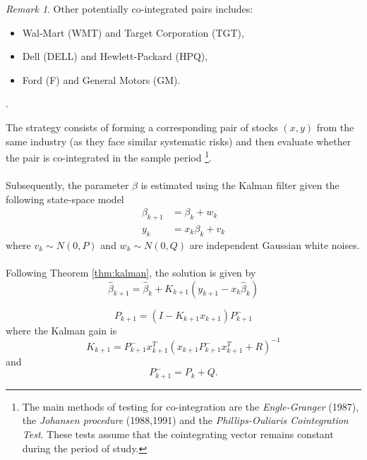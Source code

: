\documentclass{article}
\theoremstyle{definition}
\theoremstyle{remark}
\newtheorem{remark}[thm]{Remark}
\begin{document}
\begin{remark}
Other potentially co-integrated pairs includes:\\
\begin{itemize}\itemsep0pt \addtolength{\itemsep}{-1\baselineskip}
\item Wal-Mart (WMT) and Target Corporation (TGT),\\
\item Dell (DELL) and Hewlett-Packard (HPQ),\\
\item Ford (F) and General Motors (GM).
\end{itemize}
\end{remark}
{\tiny .}

The strategy consists of forming a corresponding pair of stocks $(x, y)$ from the same industry (as they face similar systematic risks) and then evaluate whether the pair is co-integrated in the sample period \footnote{The main methods of testing for co-integration are the \emph{Engle-Granger} (1987), the \emph{Johansen procedure} (1988,1991) and the \emph{Phillips-Ouliaris Cointegration Test}. These tests assume that the cointegrating vector remains constant during the period of study.}. \\
\\
Subsequently, the parameter $\beta$ is estimated using the Kalman filter given the following state-space model
\begin{align*}
\beta_{k+1}&=\beta_k+w_k\\
y_{k}&=x_k\beta_k+v_k
\end{align*}
where $v_k \sim N(0, P)$ and $w_k \sim N(0, Q)$ are independent Gaussian white noises.\\
\\
Following Theorem \ref{thm:kalman}, the solution is given by
\begin{equation*}
\hat{\beta}_{k+1}=\hat{\beta}_{k}+K_{k+1}(y_{k+1}-x_k\hat{\beta}_k)
\end{equation*}

\begin{equation*}
P_{k+1}=(I-K_{k+1}x_{k+1})P^-_{k+1}
\end{equation*}
where the Kalman gain is 
\begin{equation*}
K_{k+1}=P^-_{k+1}x_{k+1}^T(x_{k+1}P^-_{k+1}x_{k+1}^T+R)^{-1}
\end{equation*}
and
\begin{equation*}
P^-_{k+1}=P_k+Q.
\end{equation*}
\end{document}
